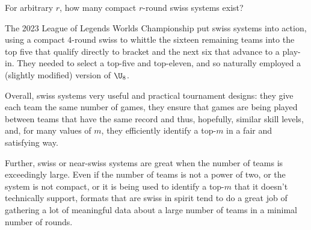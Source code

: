 {    \begin{oq}{}{}
        For arbitrary $r$, how many compact $r$-round swiss systems exist?
    \end{oq}

    The 2023 League of Legends Worlds Championship put swiss systems into action, using a compact $4$-round swiss to whittle the sixteen remaining teams into the top five that qualify directly to bracket and the next six that advance to a play-in. They needed to select a top-five and top-eleven, and so naturally employed a (slightly modified) version of $\U_8$.

    Overall, swiss systems very useful and practical tournament designs: they give each team the same number of games, they ensure that games are being played between teams that have the same record and thus, hopefully, similar skill levels, and, for many values of $m$, they efficiently identify a top-$m$ in a fair and satisfying way.

    Further, swiss or near-swiss systems are great when the number of teams is exceedingly large. Even if the number of teams is not a power of two, or the system is not compact, or it is being used to identify a top-$m$ that it doesn't technically support, formats that are swiss in spirit tend to do a great job of gathering a lot of meaningful data about a large number of teams in a minimal number of rounds.

}